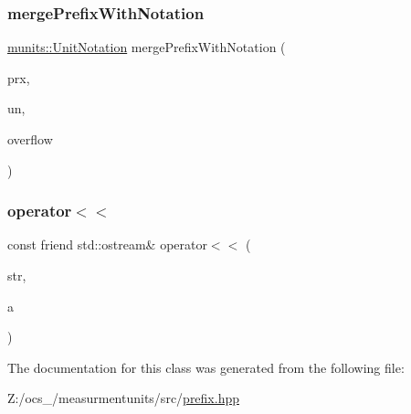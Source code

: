 \subsubsection{\texorpdfstring{merge\+Prefix\+With\+Notation}{mergePrefixWithNotation}}
{\footnotesize\ttfamily \hyperlink{classmunits_1_1_unit_notation}{munits\+::\+Unit\+Notation} merge\+Prefix\+With\+Notation (\begin{DoxyParamCaption}\item[{const \hyperlink{classmunits_1_1_prefix}{Prefix} \&}]{prx,  }\item[{const \hyperlink{classmunits_1_1_unit_notation}{munits\+::\+Unit\+Notation} \&}]{un,  }\item[{int \&}]{overflow }\end{DoxyParamCaption})\hspace{0.3cm}{\ttfamily [friend]}}

\mbox{\label{classmunits_1_1_prefix_a6dfdc18ee1d503dce5f170b4b04afa36}} 
\subsubsection{\texorpdfstring{operator$<$$<$}{operator<<}}
{\footnotesize\ttfamily const friend std\+::ostream\& operator$<$$<$ (\begin{DoxyParamCaption}\item[{std\+::ostream \&}]{str,  }\item[{const \hyperlink{classmunits_1_1_prefix}{Prefix} \&}]{a }\end{DoxyParamCaption})\hspace{0.3cm}{\ttfamily [friend]}}



The documentation for this class was generated from the following file\+:\begin{DoxyCompactItemize}
\item 
Z\+:/ocs\+\_/measurmentunits/src/\hyperlink{prefix_8hpp}{prefix.\+hpp}\end{DoxyCompactItemize}
